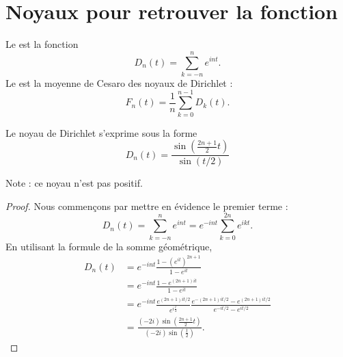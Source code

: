 \section{Noyaux pour retrouver la fonction}

Le  est la fonction
\begin{equation}
    D_n(t)=\sum_{k=-n}^n e^{int}.
\end{equation}
Le  est la moyenne de Cesaro des noyaux de Dirichlet :
\begin{equation}
    F_n(t)=\frac{1}{ n }\sum_{k=0}^{n-1}D_k(t).
\end{equation}

\begin{lemma}
    Le noyau de Dirichlet s'exprime sous la forme
    \begin{equation}    
        D_n(t)=\frac{ \sin\left( \frac{ 2n+1 }{ 2 }t \right) }{ \sin(t/2) }
    \end{equation}
\end{lemma}
Note : ce noyau n'est pas positif.

\begin{proof}
    Nous commençons par mettre en évidence le premier terme :
    \begin{equation}
        D_n(t)=\sum_{k=-n}^n e^{int}= e^{-int}\sum_{k=0}^{2n} e^{ikt}.
    \end{equation}
    En utilisant la formule de la somme géométrique,
    \begin{subequations}
        \begin{align}
            D_n(t)&= e^{-int}\frac{ 1-( e^{it})^{2n+1} }{ 1- e^{it} }\\
            &= e^{-int}\frac{ 1- e^{(2n+1)it} }{ 1- e^{it} }\\
            &= e^{-int}\frac{  e^{(2n+1)it/2} }{  e^{i\frac{ t }{ 2 }} }\frac{  e^{-(2n+1)it/2}- e^{(2n+1)it/2} }{  e^{-it/2}- e^{it/2} }\\
            &=\frac{ (-2i)\sin\left( \frac{ 2n+1 }{ 2 }t \right) }{ (-2i)\sin\left( \frac{ t }{2} \right) }.
        \end{align}
    \end{subequations}
\end{proof}


